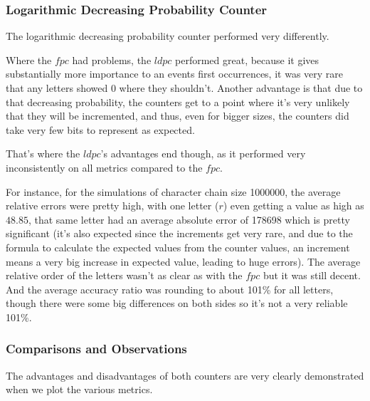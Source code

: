 \documentclass[...]{revdetua}
\begin{document}
\subsubsection{Logarithmic Decreasing Probability Counter}
The logarithmic decreasing probability counter performed very differently.\par
Where the $fpc$ had problems, the $ldpc$ performed great, because it gives substantially more importance to an events first occurrences, it was very rare that any letters showed 0 where they shouldn't. Another advantage is that due to that decreasing probability, the counters get to a point where it's very unlikely that they will be incremented, and thus, even for bigger sizes, the counters did take very few bits to represent as expected.\par
That's where the $ldpc$'s advantages end though, as it performed very inconsistently on all metrics  compared to the $fpc$.\par
For instance, for the simulations of character chain size 1000000, the average relative errors were pretty high, with one letter ($r$) even getting a value as high as $48.85$, that same letter had an average absolute error of 178698 which is pretty significant (it's also expected since the increments get very rare, and due to the formula to calculate the expected values from the counter values, an increment means a very big increase in expected value, leading to huge errors). The average relative order of the letters wasn't as clear as with the $fpc$ but it was still decent. And the average accuracy ratio was rounding to about 101\% for all letters, though there were some big differences on both sides so it's not a very reliable 101\%.
\newpage
\subsubsection{Comparisons and Observations}
The advantages and disadvantages of both counters are very clearly demonstrated when we plot the various metrics.\par
\end{document}
